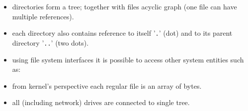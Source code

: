 
\begin{slide}
\setlength{\baselineskip}{0.8\baselineskip}
\begin{itemize}
\item directories form a tree; together with files acyclic graph
(one file can have multiple references).
\item each directory also contains reference to itself '\texttt{.}'
(dot) and to its parent directory '\texttt{..}' (two dots). 
\item using file system interfaces it is possible to access other system
entities such as:
\item from kernel's perspective each regular file is an array of bytes.
\item all (including network) drives are connected to single tree.
\end{itemize}
\end{slide}

\label{DEVFS}

